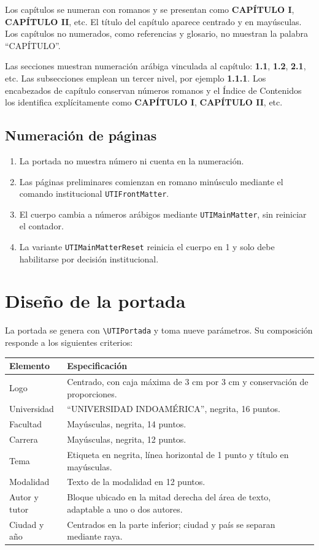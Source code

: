\documentclass[12pt,a4paper,oneside]{report}
\begin{document}
Los capítulos se numeran con romanos y se presentan como \textbf{CAPÍTULO I}, \textbf{CAPÍTULO II}, etc. El título del capítulo aparece centrado y en mayúsculas. Los capítulos no numerados, como referencias y glosario, no muestran la palabra ``CAPÍTULO''.

Las secciones muestran numeración arábiga vinculada al capítulo: \textbf{1.1}, \textbf{1.2}, \textbf{2.1}, etc. Las subsecciones emplean un tercer nivel, por ejemplo \textbf{1.1.1}. Los encabezados de capítulo conservan números romanos y el Índice de Contenidos los identifica explícitamente como \textbf{CAPÍTULO I}, \textbf{CAPÍTULO II}, etc.

\section{Numeración de páginas}

\begin{enumerate}
  \item La portada no muestra número ni cuenta en la numeración.
  \item Las páginas preliminares comienzan en romano minúsculo mediante el comando institucional \texttt{UTIFrontMatter}.
  \item El cuerpo cambia a números arábigos mediante \texttt{UTIMainMatter}, sin reiniciar el contador.
  \item La variante \texttt{UTIMainMatterReset} reinicia el cuerpo en 1 y solo debe habilitarse por decisión institucional.
\end{enumerate}

\chapter{Diseño de la portada}

La portada se genera con \texttt{\textbackslash UTIPortada} y toma nueve parámetros. Su composición responde a los siguientes criterios:

\begin{longtable}{|p{4.2cm}|p{8.4cm}|}
  \hline
  \textbf{Elemento} & \textbf{Especificación} \\
  \hline
  Logo & Centrado, con caja máxima de 3 cm por 3 cm y conservación de proporciones. \\
  \hline
  Universidad & ``UNIVERSIDAD INDOAMÉRICA'', negrita, 16 puntos. \\
  \hline
  Facultad & Mayúsculas, negrita, 14 puntos. \\
  \hline
  Carrera & Mayúsculas, negrita, 12 puntos. \\
  \hline
  Tema & Etiqueta en negrita, línea horizontal de 1 punto y título en mayúsculas. \\
  \hline
  Modalidad & Texto de la modalidad en 12 puntos. \\
  \hline
  Autor y tutor & Bloque ubicado en la mitad derecha del área de texto, adaptable a uno o dos autores. \\
  \hline
  Ciudad y año & Centrados en la parte inferior; ciudad y país se separan mediante raya. \\
  \hline
\end{longtable}
\end{document}
